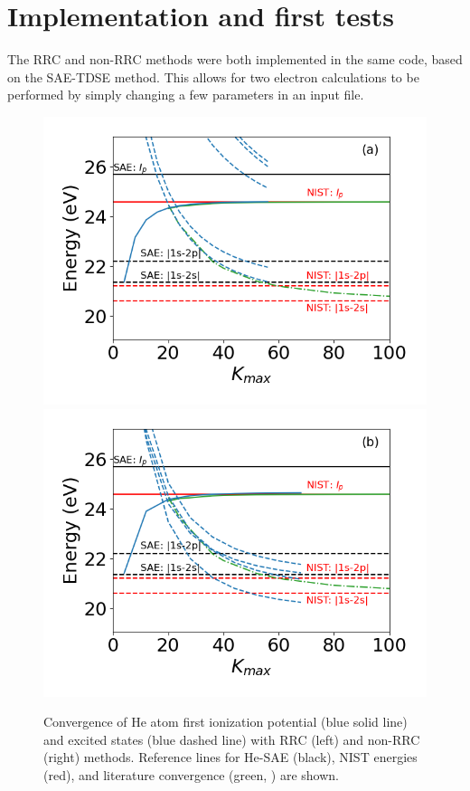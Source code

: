 
\section{Implementation and first tests} %
\label{sec:implementation_and_first_tests}
The RRC and non-RRC methods were both implemented in the same code, based on the SAE-TDSE method. This allows for two electron calculations to be performed by simply changing a few parameters in an input file. 


\begin{figure}[!ht]
\centering
\includegraphics[width=0.49\linewidth]{figs/Two_electron/2nd_order_convergence.png}
\includegraphics[width=0.49\linewidth]{figs/Two_electron/2nd_order_convergence_no_RRC.png}
\caption{Convergence of He atom first ionization potential (blue solid line) and excited states (blue dashed line) with RRC (left) and non-RRC (right) methods. Reference lines for He-SAE (black), NIST energies (red), and literature convergence (green, \cite{khan2015}) are shown.
} 
  \label{fig:he_2e_converg}
\end{figure}

